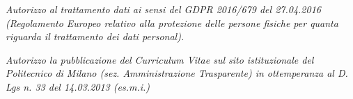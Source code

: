 \documentclass[10pt,a4paper]{article}
\newcommand{\mystrut}{\rule[-.3\baselineskip]{0pt}{\baselineskip}}
\begin{document}
 \vspace{12pt}

 \vspace{12pt}

 \vspace{12pt}

 \vspace{12pt}



%
%



\null
\vspace*{\fill}
\begin{center}
    
    \small \textit{Autorizzo al trattamento dati ai sensi del GDPR 2016/679 del 27.04.2016 (Regolamento Europeo relativo alla protezione delle persone fisiche per quanta riguarda il trattamento dei dati personal).} \vspace{4pt}

    \small \textit{Autorizzo la pubblicazione del Curriculum Vitae sul sito istituzionale del Politecnico di Milano (sez. Amministrazione Trasparente) in ottemperanza al D. Lgs n. 33 del 14.03.2013 (es.m.i.)
    }
\end{center}

\null
\hspace{-0.25\linewidth}\colorbox{bgcol}{\makebox[1.5\linewidth][c]{\mystrut \small \textcolor{white}{Francesco Ioli - \today}}}\\[-6pt]

%
%
\end{document}

